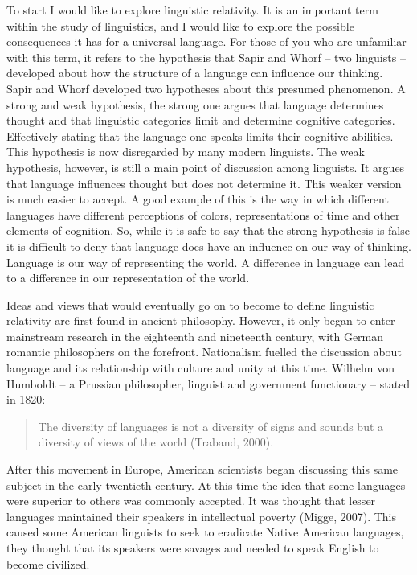 To start I would like to explore linguistic relativity. It is an important term within the study of linguistics, and I would like to explore the possible consequences it has for a universal language. For those of you who are unfamiliar with this term, it refers to the hypothesis that Sapir and Whorf – two linguists – developed about how the structure of a language can influence our thinking. Sapir and Whorf developed two hypotheses about this presumed phenomenon. A strong and weak hypothesis, the strong one argues that language determines thought and that linguistic categories limit and determine cognitive categories. Effectively stating that the language one speaks limits their cognitive abilities. This hypothesis is now disregarded by many modern linguists. The weak hypothesis, however, is still a main point of discussion among linguists. It argues that language influences thought but does not determine it. This weaker version is much easier to accept. A good example of this is the way in which different languages have different perceptions of colors, representations of time and other elements of cognition. So, while it is safe to say that the strong hypothesis is false it is difficult to deny that language does have an influence on our way of thinking. Language is our way of representing the world. A difference in language can lead to a difference in our representation of the world. 

 
	Ideas and views that would eventually go on to become to define linguistic relativity are first found  in ancient philosophy. However, it only began to enter mainstream research in the eighteenth and nineteenth century, with German romantic philosophers on the forefront. Nationalism fuelled the discussion about language and its relationship with culture and unity at this time. Wilhelm von Humboldt – a Prussian philosopher, linguist and government functionary – stated in 1820:  

\begin{quote}
\begin{singlespace}
The diversity of languages is not a diversity of signs and sounds but a diversity of views of the world (Traband, 2000). 
\end{singlespace}
\end{quote}

After this movement in Europe, American scientists began discussing this same subject in the early twentieth century. At this time the idea that some languages were superior to others was commonly accepted. It was thought that lesser languages maintained their speakers in intellectual poverty (Migge, 2007). This caused some American linguists to seek to eradicate Native American languages, they thought that its speakers were savages and needed to speak English to become civilized. 

